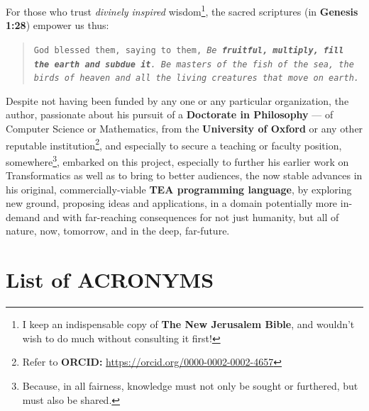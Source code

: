 \documentclass[a4paper, 18pt]{book} %
\begin{document}
For those who trust \textit{divinely inspired} wisdom\footnote{I keep an indispensable copy of \textbf{The New Jerusalem Bible}, and wouldn't wish to do much without consulting it first!}, the sacred scriptures (in \textbf{Genesis 1:28}) empower us thus:

\begin{quotation}
\noindent \texttt{God blessed them, saying to them, \textit{Be \textbf{fruitful, multiply, fill the earth and subdue it}. Be masters of the fish of the sea, the birds of heaven and all the living creatures that move on earth.}}\\
\end{quotation}


Despite not having been funded by any one or any particular organization, the author, passionate about his pursuit of a \textbf{Doctorate in Philosophy} --- of Computer Science or Mathematics, from the \textbf{University of Oxford}\cite{lutalo_2025_sop}\cite{Lutalo2025_phd} or any other reputable institution\footnote{Refer to \textbf{ORCID:} \url{https://orcid.org/0000-0002-0002-4657}}, and especially to secure a teaching or faculty position, somewhere\footnote{Because, in all fairness, knowledge must not only be sought or furthered, but must also be shared.}, embarked on this project, especially to further his earlier work on Transformatics\cite{transformatics} as well as to bring to better audiences, the now stable advances in his original, commercially-viable \textbf{TEA programming language}\cite{cli_tttt}, by exploring new ground, proposing ideas and applications, in a domain potentially more in-demand and with far-reaching consequences for not just humanity, but all of nature, now, tomorrow, and in the deep, far-future. 



\chapter*{List of ACRONYMS}
\label{CHAPACRONYMNS}
\end{document}
